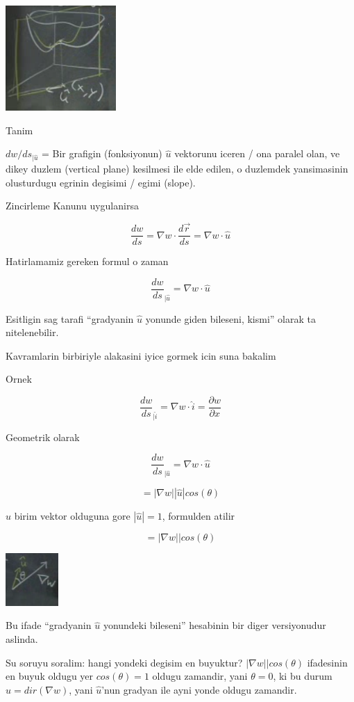 \documentclass[12pt,fleqn]{article}\usepackage{../common}
\begin{document}
\includegraphics[height=4cm]{12_7.png}

Tanim

$dw / ds_{|\hat{u}}$ = Bir grafigin (fonksiyonun) $\hat{u}$ vektorunu
iceren / ona paralel olan, ve dikey duzlem (vertical plane) kesilmesi ile
elde edilen, o duzlemdek yansimasinin olusturdugu egrinin degisimi / egimi
(slope).

Zincirleme Kanunu uygulanirsa

\[ \frac{dw}{ds} = \nabla w \cdot \frac{d\vec{r}}{ds} 
= \nabla w \cdot \hat{u}
\]

Hatirlamamiz gereken formul o zaman

\[ \frac{dw}{ds}_{|\hat{u}} =  \nabla w \cdot \hat{u} \]

Esitligin sag tarafi ``gradyanin $\hat{u}$ yonunde giden bileseni, kismi''
olarak ta nitelenebilir. 

Kavramlarin birbiriyle alakasini iyice gormek icin suna bakalim

Ornek

\[ 
\frac{dw}{ds}_{|\hat{i}} =  \nabla w \cdot \hat{i} = 
\frac{\partial w}{\partial x} \]

Geometrik olarak

\[ \frac{dw}{ds}_{|\hat{u}} =  \nabla w \cdot \hat{u} \]

\[ =  |\nabla w||\hat{u}|cos(\theta)  \]

$\hat{u}$ birim vektor olduguna gore $|\hat{u}| = 1$, formulden atilir

\[ =  |\nabla w||cos(\theta)  \]

\includegraphics[height=2cm]{12_8.png}

Bu ifade ``gradyanin $\hat{u}$ yonundeki bileseni'' hesabinin bir diger
versiyonudur aslinda. 

Su soruyu soralim: hangi yondeki degisim en buyuktur? $|\nabla
w||cos(\theta)$ ifadesinin
en buyuk oldugu yer $cos(\theta)=1$ oldugu zamandir, yani $\theta = 0$, ki
bu durum $\hat{u} = dir(\nabla w)$, yani $\hat{u}$'nun gradyan ile ayni
yonde oldugu zamandir. 
\end{document}
